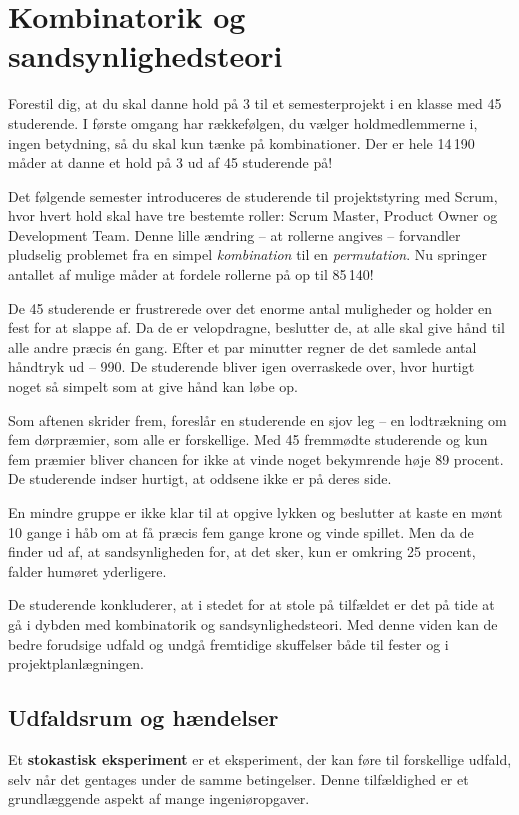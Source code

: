 \chapter{Kombinatorik og sandsynlighedsteori}
\label{chap:ch4}
Forestil dig, at du skal danne hold på 3 til et semesterprojekt i en klasse med 45 studerende. I første omgang har rækkefølgen, du vælger holdmedlemmerne i, ingen betydning, så du skal kun tænke på kombinationer. Der er hele 14\,190 måder at danne et hold på 3 ud af 45 studerende på!

Det følgende semester introduceres de studerende til projektstyring med Scrum, hvor hvert hold skal have tre bestemte roller: Scrum Master, Product Owner og Development Team. Denne lille ændring -- at rollerne angives -- forvandler pludselig problemet fra en simpel \textit{kombination} til en \textit{permutation}. Nu springer antallet af mulige måder at fordele rollerne på op til 85\,140!

De 45 studerende er frustrerede over det enorme antal muligheder og holder en fest for at slappe af. Da de er velopdragne, beslutter de, at alle skal give hånd til alle andre præcis én gang. Efter et par minutter regner de det samlede antal håndtryk ud -- 990. De studerende bliver igen overraskede over, hvor hurtigt noget så simpelt som at give hånd kan løbe op.

Som aftenen skrider frem, foreslår en studerende en sjov leg -- en lodtrækning om fem dørpræmier, som alle er forskellige. Med 45 fremmødte studerende og kun fem præmier bliver chancen for ikke at vinde noget bekymrende høje 89 procent. De studerende indser hurtigt, at oddsene ikke er på deres side.

En mindre gruppe er ikke klar til at opgive lykken og beslutter at kaste en mønt 10 gange i håb om at få præcis fem gange krone og vinde spillet. Men da de finder ud af, at sandsynligheden for, at det sker, kun er omkring 25 procent, falder humøret yderligere.

De studerende konkluderer, at i stedet for at stole på tilfældet er det på tide at gå i dybden med kombinatorik og sandsynlighedsteori. Med denne viden kan de bedre forudsige udfald og undgå fremtidige skuffelser både til fester og i projektplanlægningen.

\section{Udfaldsrum og hændelser}
\label{sec:sample_space}
Et \textbf{stokastisk eksperiment} er et eksperiment, der kan føre til forskellige udfald, selv når det gentages under de samme betingelser. Denne tilfældighed er et grundlæggende aspekt af mange ingeniøropgaver.

